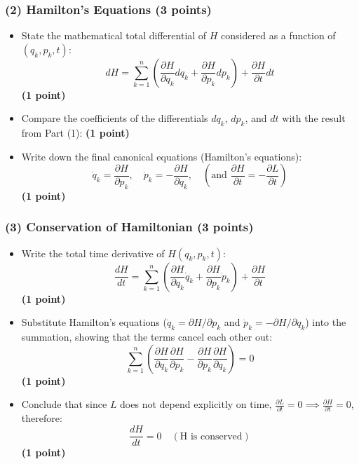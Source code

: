 \documentclass[11pt, a4paper]{article} %
\begin{document}
\subsubsection*{(2) Hamilton's Equations (3 points)}
\begin{itemize}
    \item State the mathematical total differential of $H$ considered as a function of $(q_k, p_k, t)$:
    \[
    dH = \sum_{k=1}^n \left( \frac{\partial H}{\partial q_k} dq_k + \frac{\partial H}{\partial p_k} dp_k \right) + \frac{\partial H}{\partial t} dt
    \]
    \hfill \textbf{(1 point)}

    \item Compare the coefficients of the differentials $dq_k$, $dp_k$, and $dt$ with the result from Part (1):
    \hfill \textbf{(1 point)}

    \item Write down the final canonical equations (Hamilton's equations):
    \[
    \dot{q}_k = \frac{\partial H}{\partial p_k}, \quad \dot{p}_k = -\frac{\partial H}{\partial q_k}, \quad \left( \text{and } \frac{\partial H}{\partial t} = -\frac{\partial L}{\partial t} \right)
    \]
    \hfill \textbf{(1 point)}
\end{itemize}

\subsubsection*{(3) Conservation of Hamiltonian (3 points)}
\begin{itemize}
    \item Write the total time derivative of $H(q_k, p_k, t)$:
    \[
    \frac{dH}{dt} = \sum_{k=1}^n \left( \frac{\partial H}{\partial q_k} \dot{q}_k + \frac{\partial H}{\partial p_k} \dot{p}_k \right) + \frac{\partial H}{\partial t}
    \]
    \hfill \textbf{(1 point)}

    \item Substitute Hamilton's equations ($\dot{q}_k = \partial H/\partial p_k$ and $\dot{p}_k = -\partial H/\partial q_k$) into the summation, showing that the terms cancel each other out:
    \[
    \sum_{k=1}^n \left( \frac{\partial H}{\partial q_k} \frac{\partial H}{\partial p_k} - \frac{\partial H}{\partial p_k} \frac{\partial H}{\partial q_k} \right) = 0
    \]
    \hfill \textbf{(1 point)}

    \item Conclude that since $L$ does not depend explicitly on time, $\frac{\partial L}{\partial t} = 0 \implies \frac{\partial H}{\partial t} = 0$, therefore:
    \[
    \frac{dH}{dt} = 0 \quad (\text{H is conserved})
    \]
    \hfill \textbf{(1 point)}
\end{itemize}
\end{document}
